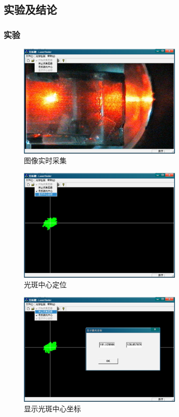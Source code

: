 \documentclass{beamer}
\begin{document}
\subsection{实验及结论}

\begin{frame}
  \frametitle{实验}
  \begin{overprint}
    \begin{figure}
    \center
    \includegraphics[width=0.7\textwidth]{image/exp1}
    \caption{\small 图像实时采集}
    \end{figure}
    \begin{figure}
    \center
    \includegraphics[width=0.7\textwidth]{image/exp2}
    \caption{\small 光斑中心定位}
    \end{figure}
    \begin{figure}
    \center
    \includegraphics[width=0.7\textwidth]{image/exp3}
    \caption{\small 显示光斑中心坐标}
    \end{figure}
  \end{overprint}
\end{frame}
\end{document}
